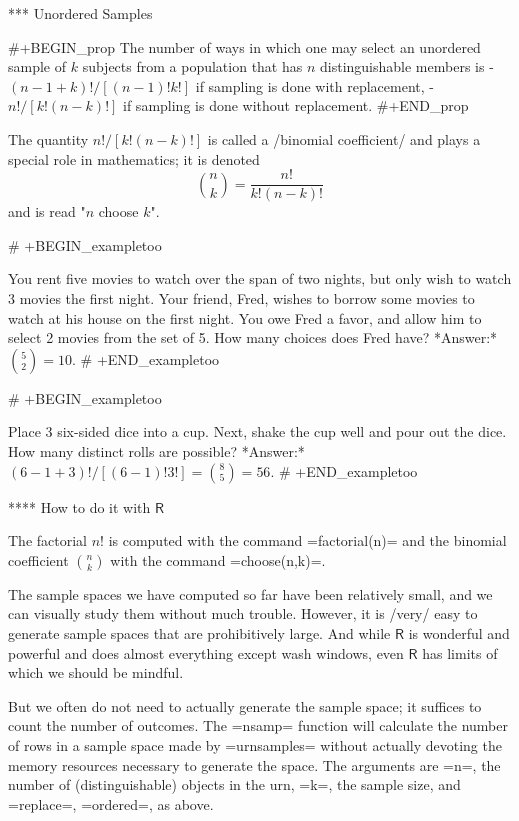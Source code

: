 *** Unordered Samples

#+BEGIN_prop
The number of ways in which one may select an unordered sample of
\(k\) subjects from a population that has \(n\) distinguishable
members is
- \((n-1+k)!/[(n-1)!k!]\) if sampling is done with replacement,
- \(n!/[k!(n-k)!]\) if sampling is done without replacement.
#+END_prop

The quantity \(n!/[k!(n-k)!]\) is called a /binomial coefficient/ and
plays a special role in mathematics; it is denoted  
\begin{equation}
\label{eq-binomial-coefficient}
{n \choose k}=\frac{n!}{k!(n-k)!}
\end{equation}
and is read "\(n\) choose \(k\)".

# +BEGIN_exampletoo

You rent five movies to watch over the span of two nights, but only
wish to watch 3 movies the first night. Your friend, Fred, wishes to
borrow some movies to watch at his house on the first night. You owe
Fred a favor, and allow him to select 2 movies from the set of 5. How
many choices does Fred have? *Answer:* \({5 \choose 2}=10\).
# +END_exampletoo


# +BEGIN_exampletoo

Place 3 six-sided dice into a cup. Next, shake the cup well and pour
out the dice. How many distinct rolls are possible? *Answer:*
\((6-1+3)!/[(6-1)!3!]={8 \choose 5}=56\).
# +END_exampletoo

**** How to do it with \(\mathsf{R}\)

The factorial \(n!\) is computed with the command =factorial(n)= and
the binomial coefficient \({n \choose k}\) with the command
=choose(n,k)=.

The sample spaces we have computed so far have been relatively small,
and we can visually study them without much trouble. However, it is
/very/ easy to generate sample spaces that are prohibitively
large. And while \(\mathsf{R}\) is wonderful and powerful and does
almost everything except wash windows, even \(\mathsf{R}\) has limits
of which we should be mindful.

But we often do not need to actually generate the sample space; it
suffices to count the number of outcomes. The =nsamp= function will
calculate the number of rows in a sample space made by =urnsamples=
without actually devoting the memory resources necessary to generate
the space. The arguments are =n=, the number of (distinguishable)
objects in the urn, =k=, the sample size, and =replace=, =ordered=, as
above.

